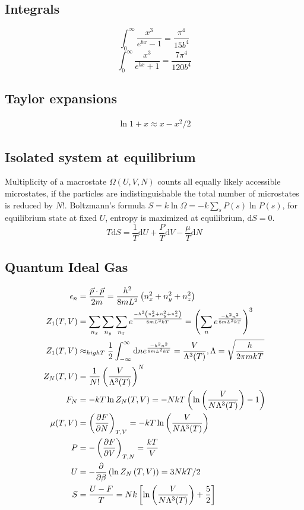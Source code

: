 \documentclass[a4paper, norsk, 8pt]{article}
\begin{document}
\begin{multicols*}{3}
\subsection*{\footnotesize  Integrals}
$$ \int_0^{\infty} \frac{x^3}{e^{bx}-1} = \frac{\pi^4}{15b^4}$$
$$ \int_0^{\infty} \frac{x^3}{e^{bx}+1} = \frac{7\pi^4}{120b^4}$$

\subsection*{\footnotesize  Taylor expansions}
\begin{align*}
  \ln{1+x} \approx x - x^2/2
\end{align*}

\subsection*{\footnotesize  Isolated system at equilibrium}
Multiplicity of a macrostate $\Omega(U,V,N)$ counts all equally likely accessible microstates, if the particles are indistinguishable the total number of microstates is reduced by $N!$. Boltzmann's formula $S=k\ln{\Omega} = -k\sum_{s}P(s)\ln{P(s)}$, for equilibrium state at fixed $U$, entropy is maximized at equilibrium, $\mbox{d}S=0$.
\begin{equation}
    T\mbox{d}S = \frac{1}{T}\mbox{d}U  + \frac{P}{T}\mbox{d}V - \frac{\mu}{T}\mbox{d}N
\end{equation}

\subsection*{\footnotesize Quantum Ideal Gas}
\begin{align*}
  \epsilon_n &= \frac{\vec{p}\cdot\vec{p}}{2m}  = \frac{h^2}{8mL^2}\left(n_x^2+n_y^2+n_z^2\right) \\
  Z_1(T,V) &= \sum_{n_x}\sum_{n_y}\sum_{n_z}e^{\frac{-h^2\left(n_x^2+n_y^2+n_z^2\right)}{8mL^2kT}} = \left( \sum_{n}e^{\frac{-h^2n^2}{8mL^2kT}} \right)^3 \\
  Z_1(T,V) &\approx_{high T} \frac{1}{2}\int_{-\infty}^{\infty}\mbox{d}n e^{\frac{-h^2n^2}{8mL^2kT}} = \frac{V}{\Lambda^3(T)}, \Lambda = \sqrt{\frac{h}{2\pi mkT}}\\
  Z_N(T,V) &= \frac{1}{N!}\left(\frac{V}{\Lambda^3(T)}\right)^N \\
  F_N &= -kT\ln{Z_N(T,V)} = -NkT\left( \ln{\left( \frac{V}{N\Lambda^3(T)}\right)} -1 \right)\\
  \mu(T,V) &= \left( \pdv{F}{N} \right)_{T,V} = -kT\ln{\left( \frac{V}{N\Lambda^3(T)} \right)} \\
  P &= -\left( \pdv{F}{V} \right)_{T,N} = \frac{kT}{V}\\
  U &= -\pdv{}{\beta}\left( \ln{Z_N\left(T, V\right)}\right) = 3NkT/2 \\
  S &= \frac{U-F}{T} = Nk\left[ \ln{\left( \frac{V}{N\Lambda^3(T)} \right)} + \frac{5}{2} \right]
\end{align*}

\end{multicols*}
\end{document}
